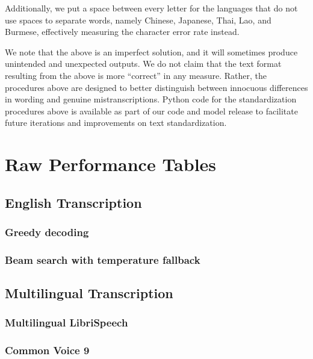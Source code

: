 \documentclass[nohyperref]{article}
\theoremstyle{plain}
\theoremstyle{definition}
\theoremstyle{remark}
\begin{document}
Additionally, we put a space between every letter for the languages that do not use spaces to separate words, namely Chinese, Japanese, Thai, Lao, and Burmese, effectively measuring the character error rate instead.

We note that the above is an imperfect solution, and it will sometimes produce unintended and unexpected outputs. We do not claim that the text format resulting from the above is more ``correct'' in any measure. Rather, the procedures above are designed to better distinguish between innocuous differences in wording and genuine mistranscriptions. Python code for the standardization procedures above is available as part of our code and model release to facilitate future iterations and improvements on text standardization.


\vfill
\pagebreak


\section{Raw Performance Tables}\label{sec:raw-performance}

\subsection{English Transcription}

\subsubsection{Greedy decoding}


\subsubsection{Beam search with temperature fallback}



\subsection{Multilingual Transcription}

\subsubsection{Multilingual LibriSpeech}

\vspace{-1em}

\subsubsection{Common Voice 9}

\vspace{-1em}
\end{document}
